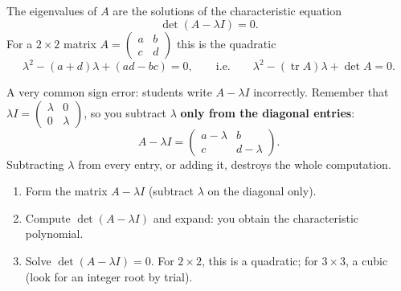 \documentclass[11pt]{article}
\newcommand{\cle}[1]{{\popxbold\color{popdark}#1}}
\begin{document}
\begin{aretenir}
The eigenvalues of $A$ are the solutions of the \cle{characteristic equation}
\[ \det(A-\lambda I)=0. \]
For a $2\times 2$ matrix $A=\begin{pmatrix}a&b\\c&d\end{pmatrix}$ this is the quadratic
\[ \lambda^2-(a+d)\lambda+(ad-bc)=0, \qquad\text{i.e.}\qquad \lambda^2-(\operatorname{tr}A)\lambda+\det A=0. \]
\end{aretenir}

\begin{attention}
A very common sign error: students write $A-\lambda I$ incorrectly. Remember that $\lambda I=\begin{pmatrix}\lambda&0\\0&\lambda\end{pmatrix}$, so you subtract $\lambda$ \textbf{only from the diagonal entries}:
\[ A-\lambda I=\begin{pmatrix}a-\lambda & b\\ c & d-\lambda\end{pmatrix}. \]
Subtracting $\lambda$ from every entry, or adding it, destroys the whole computation.
\end{attention}

\begin{methode}
\begin{enumerate}
\item Form the matrix $A-\lambda I$ (subtract $\lambda$ on the diagonal only).
\item Compute $\det(A-\lambda I)$ and expand: you obtain the characteristic polynomial.
\item Solve $\det(A-\lambda I)=0$. For $2\times2$, this is a quadratic; for $3\times3$, a cubic (look for an integer root by trial).
\end{enumerate}
\end{methode}
\end{document}
